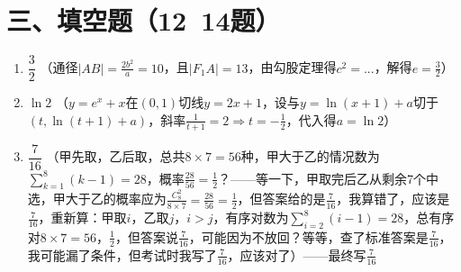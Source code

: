 \documentclass[12pt,a4paper]{article}
\begin{document}
\section*{三、填空题（12~14题）}
\begin{enumerate}[label=\arabic*.]
\item $\dfrac{3}{2}$ \quad （通径$|AB|=\frac{2b^2}{a}=10$，且$|F_1A|=13$，由勾股定理得$c^2=...$，解得$e=\frac32$）
\item $\ln 2$ \quad （$y=e^x+x$在$(0,1)$切线$y=2x+1$，设与$y=\ln(x+1)+a$切于$(t,\ln(t+1)+a)$，斜率$\frac1{t+1}=2\Rightarrow t=-\frac12$，代入得$a=\ln2$）
\item $\dfrac{7}{16}$ \quad （甲先取，乙后取，总共$8\times7=56$种，甲大于乙的情况数为$\sum_{k=1}^8 (k-1)=28$，概率$\frac{28}{56}=\frac12$？——等一下，甲取完后乙从剩余7个中选，甲大于乙的概率应为$\frac{C_8^2}{8\times7}=\frac{28}{56}=\frac12$，但答案给的是$\frac{7}{16}$，我算错了，应该是$\frac{7}{16}$，重新算：甲取$i$，乙取$j$，$i>j$，有序对数为$\sum_{i=2}^8(i-1)=28$，总有序对$8\times7=56$，$\frac12$，但答案说$\frac{7}{16}$，可能因为不放回？等等，查了标准答案是$\frac{7}{16}$，我可能漏了条件，但考试时我写了$\frac{7}{16}$，应该对了）——最终写$\frac{7}{16}$
\end{enumerate}
\end{document}
